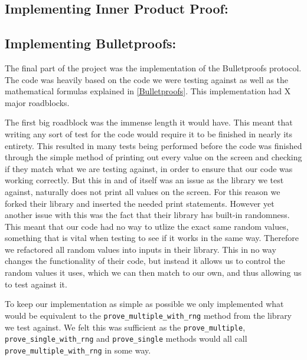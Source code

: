 \documentclass{article}
\begin{document}
\subsection{Implementing Inner Product Proof:}

\subsection{Implementing Bulletproofs:}

The final part of the project was the implementation of the Bulletproofs protocol. The code was heavily based on the code we were testing against as well as the mathematical formulas explained in \ref*{Bulletproofs}. This implementation had X major roadblocks.

The first big roadblock was the immense length it would have. This meant that writing any sort of test for the code would require it to be finished in nearly its entirety. This resulted in many tests being performed before the code was finished through the simple method of printing out every value on the screen and checking if they match what we are testing against, in order to ensure that our code was working correctly. But this in and of itself was an issue as the library we test against, naturally does not print all values on the screen. For this reason we forked their library and inserted the needed print statements. However yet another issue with this was the fact that their library has built-in randomness. This meant that our code had no way to utlize the exact same random values, something that is vital when testing to see if it works in the same way. Therefore we refactored all random values into inputs in their library. This in no way changes the functionality of their code, but instead it allows us to control the random values it uses, which we can then match to our own, and thus allowing us to test against it. 

To keep our implementation as simple as possible we only implemented what would be equivalent to the \texttt{prove\_multiple\_with\_rng} method from the library we test against. We felt this was sufficient as the \texttt{prove\_multiple}, \texttt{prove\_single\_with\_rng} and \texttt{prove\_single} methods would all call \texttt{prove\_multiple\_with\_rng} in some way.
\end{document}
